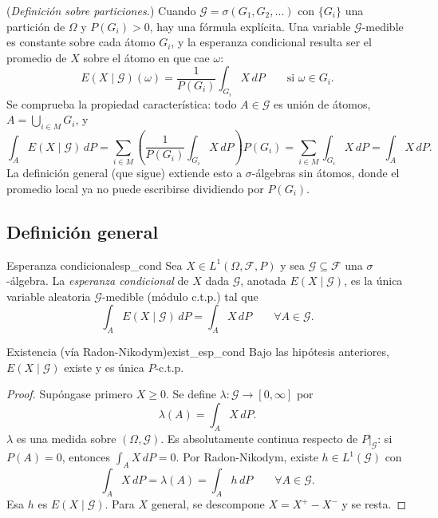 \documentclass[11pt, a4paper]{article}
\begin{document}
\obs (\emph{Definición sobre particiones.}) Cuando $\mathcal{G} = \sigma(G_1, G_2, \dots)$ con
$\{G_i\}$ una partición de $\Omega$ y $P(G_i) > 0$, hay una fórmula explícita. Una variable
$\mathcal{G}$-medible es constante sobre cada átomo $G_i$, y la esperanza condicional resulta
ser el promedio de $X$ sobre el átomo en que cae $\omega$:
$$ E(X \mid \mathcal{G})(\omega) = \frac{1}{P(G_i)} \int_{G_i} X \, dP \qquad \text{si }
\omega \in G_i. $$
Se comprueba la propiedad característica: todo $A \in \mathcal{G}$ es unión de átomos,
$A = \bigcup_{i \in M} G_i$, y
$$ \int_A E(X \mid \mathcal{G}) \, dP = \sum_{i \in M} \left( \frac{1}{P(G_i)} \int_{G_i} X \,
dP \right) P(G_i) = \sum_{i \in M} \int_{G_i} X \, dP = \int_A X \, dP. $$
La definición general (que sigue) extiende esto a $\sigma$-álgebras sin átomos, donde el
promedio local ya no puede escribirse dividiendo por $P(G_i)$.

\subsection{Definición general}

\begin{definicion}{Esperanza condicional}{esp_cond}
Sea $X \in L^1(\Omega, \mathcal{F}, P)$ y sea $\mathcal{G} \subseteq \mathcal{F}$ una
$\sigma$-álgebra. La \emph{esperanza condicional} de $X$ dada $\mathcal{G}$, anotada
$E(X \mid \mathcal{G})$, es la única variable aleatoria $\mathcal{G}$-medible (módulo c.t.p.)
tal que
$$ \int_A E(X \mid \mathcal{G}) \, dP = \int_A X \, dP \qquad \forall A \in \mathcal{G}. $$
\end{definicion}

\begin{teorema}{Existencia (vía Radon-Nikodym)}{exist_esp_cond}
Bajo las hipótesis anteriores, $E(X \mid \mathcal{G})$ existe y es única $P$-c.t.p.
\end{teorema}

\begin{proof}
Supóngase primero $X \ge 0$. Se define $\lambda: \mathcal{G} \to [0, \infty]$ por
$$ \lambda(A) = \int_A X \, dP. $$
$\lambda$ es una medida sobre $(\Omega, \mathcal{G})$. Es absolutamente continua respecto de
$P|_{\mathcal{G}}$: si $P(A) = 0$, entonces $\int_A X \, dP = 0$. Por Radon-Nikodym, existe
$h \in L^1(\mathcal{G})$ con
$$ \int_A X \, dP = \lambda(A) = \int_A h \, dP \qquad \forall A \in \mathcal{G}. $$
Esa $h$ es $E(X \mid \mathcal{G})$. Para $X$ general, se descompone $X = X^+ - X^-$ y se resta.
\end{proof}
\end{document}
